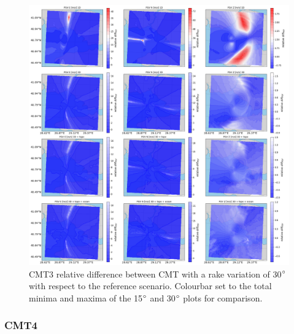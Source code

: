 \documentclass[../Text/00main.tex]{subfiles}
\begin{document}
\begin{figure}[!h]
    \centering
    \includegraphics[width=1\linewidth,trim = 2cm 5cm 1cm 5cm, clip]{images_results/rake_variation_epsilon25_sc3.png}
    \caption{CMT3 relative difference between CMT with a rake variation of 30$\degree$ with respect to the reference scenario. Colourbar set to the total minima and maxima of the 15$\degree$ and 30$\degree$ plots for comparison.}
    \label{fig:ref_eps25-2}
\end{figure}

\FloatBarrier

\subsubsection{CMT4}
\end{document}
